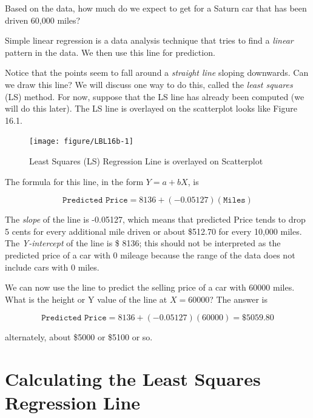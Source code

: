 \documentclass[11pt, chapterprefix=true]{scrbook}\usepackage[]{graphicx}\usepackage[]{color}
\begin{document}
Based on the data, how much do we expect to get for a Saturn car that has been driven 60,000 miles?

Simple linear regression is a data analysis technique that tries to find a \textit{linear} pattern in the data.  We then use this line for prediction.

Notice that the points seem to fall around a \textit{straight line} sloping downwards.  Can we draw this line?  We will discuss one way to do this, called the \textit{least squares} (LS) method.  For now, suppose that the LS line has already been computed (we will do this later).  The LS line is overlayed on the scatterplot looks like Figure 16.1.

\begin{figure}[ht]
\centering
\caption{Least Squares (LS) Regression Line is overlayed on Scatterplot}



{\centering \texttt{[image: figure/LBL16b-1]} 

}




\end{figure}

The formula for this line, in the form $Y= a + bX$,  is 

\begin{equation*}
  \texttt{Predicted Price} = 8136 + (-0.05127)(\texttt{Miles})
\end{equation*}

The \textit{slope} of the line is -0.05127, which means that predicted Price tends to drop 5 cents for every additional mile driven or about \$512.70 for every 10,000 miles. The \textit{Y-intercept} of the line is \$ 8136; this should not be interpreted as the predicted price of a car with 0 mileage because the range of the data does not include cars with 0 miles.  

We can now use the line to predict the selling price of a car with 60000 miles.  What is the height or Y value of the line at $X = 60000$?  The answer is

\begin{equation*}
  \texttt{Predicted Price} = 8136 + (-0.05127)(60000) = \$5059.80
\end{equation*}

alternately, about \$5000 or \$5100 or so.

\section{Calculating the Least Squares Regression Line}
\end{document}
